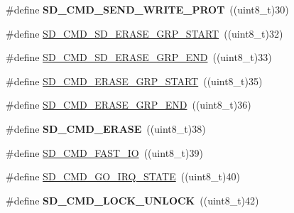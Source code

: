 \begin{DoxyCompactItemize}
\item 
\#define {\bfseries S\+D\+\_\+\+C\+M\+D\+\_\+\+S\+E\+N\+D\+\_\+\+W\+R\+I\+T\+E\+\_\+\+P\+R\+OT}~((uint8\+\_\+t)30)\hypertarget{group___s_t_m324x_g___e_v_a_l___s_d_i_o___s_d___exported___constants_gabeb680262be8cc173543ae8b1874c83d}{}\label{group___s_t_m324x_g___e_v_a_l___s_d_i_o___s_d___exported___constants_gabeb680262be8cc173543ae8b1874c83d}

\item 
\#define \hyperlink{group___s_t_m324x_g___e_v_a_l___s_d_i_o___s_d___exported___constants_ga34496e2b57973936b853bb1d20dc277d}{S\+D\+\_\+\+C\+M\+D\+\_\+\+S\+D\+\_\+\+E\+R\+A\+S\+E\+\_\+\+G\+R\+P\+\_\+\+S\+T\+A\+RT}~((uint8\+\_\+t)32)
\item 
\#define \hyperlink{group___s_t_m324x_g___e_v_a_l___s_d_i_o___s_d___exported___constants_gae3118ae546ea7ba60735b866552047ac}{S\+D\+\_\+\+C\+M\+D\+\_\+\+S\+D\+\_\+\+E\+R\+A\+S\+E\+\_\+\+G\+R\+P\+\_\+\+E\+ND}~((uint8\+\_\+t)33)
\item 
\#define \hyperlink{group___s_t_m324x_g___e_v_a_l___s_d_i_o___s_d___exported___constants_gae91f1c058f4b0aace233e0e4866fa1d3}{S\+D\+\_\+\+C\+M\+D\+\_\+\+E\+R\+A\+S\+E\+\_\+\+G\+R\+P\+\_\+\+S\+T\+A\+RT}~((uint8\+\_\+t)35)
\item 
\#define \hyperlink{group___s_t_m324x_g___e_v_a_l___s_d_i_o___s_d___exported___constants_gabd1685e886f2b4cdeed5813d430a9bf3}{S\+D\+\_\+\+C\+M\+D\+\_\+\+E\+R\+A\+S\+E\+\_\+\+G\+R\+P\+\_\+\+E\+ND}~((uint8\+\_\+t)36)
\item 
\#define {\bfseries S\+D\+\_\+\+C\+M\+D\+\_\+\+E\+R\+A\+SE}~((uint8\+\_\+t)38)\hypertarget{group___s_t_m324x_g___e_v_a_l___s_d_i_o___s_d___exported___constants_ga16f4d3918ba7fb538f8d1f3fb8bb0bd1}{}\label{group___s_t_m324x_g___e_v_a_l___s_d_i_o___s_d___exported___constants_ga16f4d3918ba7fb538f8d1f3fb8bb0bd1}

\item 
\#define \hyperlink{group___s_t_m324x_g___e_v_a_l___s_d_i_o___s_d___exported___constants_gac8319cdb71748237d00c937f0fa47fda}{S\+D\+\_\+\+C\+M\+D\+\_\+\+F\+A\+S\+T\+\_\+\+IO}~((uint8\+\_\+t)39)
\item 
\#define \hyperlink{group___s_t_m324x_g___e_v_a_l___s_d_i_o___s_d___exported___constants_gac71656d887c8fad884e95ec525a0a8af}{S\+D\+\_\+\+C\+M\+D\+\_\+\+G\+O\+\_\+\+I\+R\+Q\+\_\+\+S\+T\+A\+TE}~((uint8\+\_\+t)40)
\item 
\#define {\bfseries S\+D\+\_\+\+C\+M\+D\+\_\+\+L\+O\+C\+K\+\_\+\+U\+N\+L\+O\+CK}~((uint8\+\_\+t)42)\hypertarget{group___s_t_m324x_g___e_v_a_l___s_d_i_o___s_d___exported___constants_gac89f6043b27673973f4a2b7e106a5f63}{}\label{group___s_t_m324x_g___e_v_a_l___s_d_i_o___s_d___exported___constants_gac89f6043b27673973f4a2b7e106a5f63}


\end{DoxyCompactItemize}

